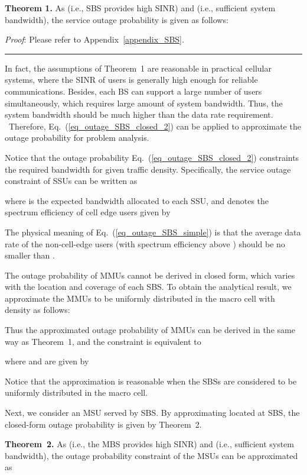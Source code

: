 \documentclass[12pt, draftclsnofoot,onecolumn]{IEEEtran}
\begin{document}
    \textbf{Theorem 1.} As  (i.e., SBS provides high SINR) and  (i.e., sufficient system bandwidth), the service outage probability is given as follows:
            
    \emph{Proof}: Please refer to Appendix~\ref{appendix_SBS}.
    \hfill \rule{4pt}{8pt}

In fact, the assumptions of Theorem~1 are reasonable in practical cellular systems, where the SINR of users is generally high enough for reliable communications.
Besides, each BS can support a large number of users simultaneously, which requires large amount of system bandwidth.
Thus, the system bandwidth should be much higher than the data rate requirement. \
Therefore, Eq.~(\ref{eq_outage_SBS_closed_2}) can be applied to approximate the outage probability for problem analysis.

Notice that the outage probability Eq.~(\ref{eq_outage_SBS_closed_2}) constraints the required bandwidth for given traffic density. 
Specifically, the service outage constraint of SSUs  can be written as
        
where  is the expected bandwidth allocated to each SSU, and  denotes the spectrum efficiency of cell edge users given by
        
The physical meaning of Eq.~(\ref{eq_outage_SBS_simple}) is that the average data rate of the non-cell-edge users (with spectrum efficiency above ) should be no smaller than .

The outage probability of MMUs cannot be derived in closed form, which varies with the location and coverage of each SBS.
To obtain the analytical result, we approximate the MMUs to be uniformly distributed in the macro cell with density  as follows:

Thus the approximated outage probability of MMUs can be derived in the same way as Theorem~1, and the constraint  is equivalent to
            
where  and  are given by
            
Notice that the approximation is reasonable when the SBSs are considered to be uniformly distributed in the macro cell.

Next, we consider an MSU  served by SBS.
By approximating  located at SBS, the closed-form outage probability is given by Theorem~2.

    \textbf{Theorem~2.} As  (i.e., the MBS provides high SINR) and  (i.e., sufficient system bandwidth), the outage probability constraint of the MSUs  can be approximated as
            
\end{document}

